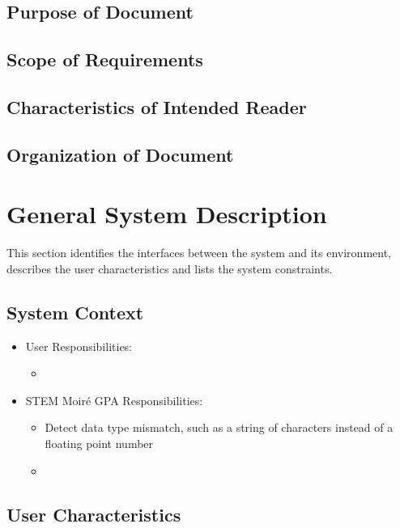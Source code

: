 \documentclass[12pt]{article}
\newcommand{\progname}{STEM Moir{\'e} GPA}
\begin{document}
\subsection{Purpose of Document}

\subsection{Scope of Requirements} 

\subsection{Characteristics of Intended Reader} 

\subsection{Organization of Document}

\section{General System Description}

This section identifies the interfaces between the system and its environment,
describes the user characteristics and lists the system constraints.

\subsection{System Context}


\begin{itemize}
\item User Responsibilities:
\begin{itemize}
\item 
\end{itemize}
\item \progname{} Responsibilities:
\begin{itemize}
\item Detect data type mismatch, such as a string of characters instead of a
  floating point number
\item 
\end{itemize}
\end{itemize}

\subsection{User Characteristics} \label{SecUserCharacteristics}
\end{document}
